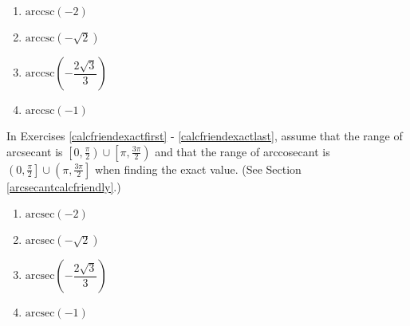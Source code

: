 \begin{multicols}{4}

\begin{enumerate}

\setcounter{enumi}{\value{HW}}

\item $\mbox{arccsc} \left( -2 \right)$  
\item $\mbox{arccsc} \left( -\sqrt{2} \right)$  
\item $\mbox{arccsc} \left( -\dfrac{2\sqrt{3}}{3} \right)$
\item $\mbox{arccsc} \left( -1 \right)$   \label{trigfriendexactlast}

\setcounter{HW}{\value{enumi}}

\end{enumerate}

\end{multicols}


\pagebreak

In Exercises \ref{calcfriendexactfirst} - \ref{calcfriendexactlast}, assume that the range of arcsecant is $\left[0, \frac{\pi}{2} \right) \cup \left[\pi, \frac{3\pi}{2} \right)$ and that the range of arccosecant is $\left(0, \frac{\pi}{2} \right] \cup \left( \pi, \frac{3\pi}{2} \right]$ when finding the exact value.  (See Section \ref{arcsecantcalcfriendly}.)


\begin{multicols}{4} 

\begin{enumerate}

\setcounter{enumi}{\value{HW}}

\item $\mbox{arcsec} \left( -2 \right)$  \label{calcfriendexactfirst}
\item $\mbox{arcsec} \left( -\sqrt{2} \right)$  
\item $\mbox{arcsec} \left( -\dfrac{2\sqrt{3}}{3} \right)$
\item $\mbox{arcsec} \left( -1 \right)$  

\setcounter{HW}{\value{enumi}}

\end{enumerate}

\end{multicols}

